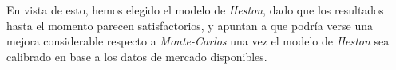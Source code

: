\noindent En vista de esto, hemos elegido el modelo de \textit{Heston}, dado que los resultados hasta el momento parecen satisfactorios, y apuntan a que podría verse una mejora considerable respecto a \textit{Monte-Carlos} una vez el modelo de \textit{Heston} sea calibrado en base a los datos de mercado disponibles.
\newpage